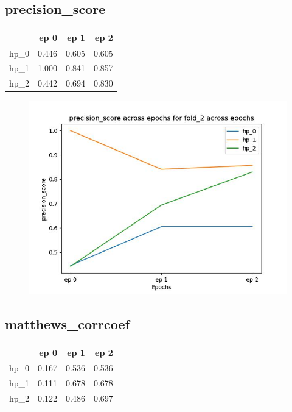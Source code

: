 \documentclass{article}
\begin{document}
\subsection{precision\_score}
\begin{tabular}{lrrr}
\toprule
{} &   ep 0 &   ep 1 &   ep 2 \\
\midrule
hp\_0 &  0.446 &  0.605 &  0.605 \\
hp\_1 &  1.000 &  0.841 &  0.857 \\
hp\_2 &  0.442 &  0.694 &  0.830 \\
\bottomrule
\end{tabular}

\begin{figure}[H]
\includegraphics[scale = 0.75]{fold_2/precision_score}
\end{figure}
\subsection{matthews\_corrcoef}
\begin{tabular}{lrrr}
\toprule
{} &   ep 0 &   ep 1 &   ep 2 \\
\midrule
hp\_0 &  0.167 &  0.536 &  0.536 \\
hp\_1 &  0.111 &  0.678 &  0.678 \\
hp\_2 &  0.122 &  0.486 &  0.697 \\
\bottomrule
\end{tabular}
\end{document}
